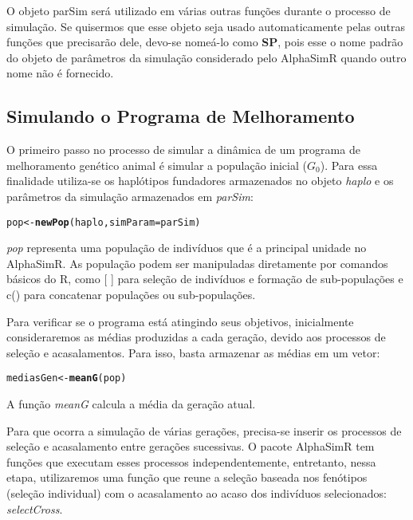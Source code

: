 \documentclass{article}\usepackage[]{graphicx}\usepackage[]{xcolor}
\makeatletter
\newcommand{\hlstd}[1]{\textcolor[rgb]{0.345,0.345,0.345}{#1}}%
\newcommand{\hlkwb}[1]{\textcolor[rgb]{0.69,0.353,0.396}{#1}}%
\newcommand{\hlkwc}[1]{\textcolor[rgb]{0.333,0.667,0.333}{#1}}%
\newcommand{\hlkwd}[1]{\textcolor[rgb]{0.737,0.353,0.396}{\textbf{#1}}}%
\newenvironment{kframe}{%
 \def\at@end@of@kframe{}%
 \ifinner\ifhmode%
  \def\at@end@of@kframe{\end{minipage}}%
  \begin{minipage}{\columnwidth}%
 \fi\fi%
 \def\FrameCommand##1{\hskip\@totalleftmargin \hskip-\fboxsep
 \colorbox{shadecolor}{##1}\hskip-\fboxsep
     \hskip-\linewidth \hskip-\@totalleftmargin \hskip\columnwidth}%
 \MakeFramed {\advance\hsize-\width
   \@totalleftmargin\z@ \linewidth\hsize
   \@setminipage}}%
 {\par\unskip\endMakeFramed%
 \at@end@of@kframe}
\newenvironment{knitrout}{}{} %
\makeatother
\begin{document}
O objeto parSim será utilizado em várias outras funções durante o processo de simulação. Se quisermos que esse objeto seja usado automaticamente pelas outras funções que precisarão dele, devo-se nomeá-lo como \textbf{SP}, pois esse o nome padrão do objeto de parâmetros da simulação considerado pelo AlphaSimR quando outro nome não é fornecido.

\subsection{Simulando o Programa de Melhoramento}

O primeiro passo no processo de simular a dinâmica de um programa de melhoramento genético animal é simular a população inicial ($G_0$). Para essa finalidade utiliza-se os haplótipos fundadores armazenados no objeto \emph{haplo} e os parâmetros da simulação armazenados em \emph{parSim}:
\begin{knitrout}
\color{fgcolor}\begin{kframe}
\begin{alltt}
\hlstd{pop}\hlkwb{<-}\hlkwd{newPop}\hlstd{(haplo,} \hlkwc{simParam} \hlstd{= parSim)}
\end{alltt}
\end{kframe}
\end{knitrout}

\emph{pop} representa uma população de indivíduos que é a principal unidade no AlphaSimR. As população podem ser manipuladas diretamente por comandos básicos do R, como [ ] para seleção de indivíduos e formação de sub-populações e c() para concatenar populações ou sub-populações.

Para verificar se o programa está atingindo seus objetivos, inicialmente consideraremos as médias produzidas a cada geração, devido aos processos de seleção e acasalamentos. Para isso, basta armazenar as médias em um vetor:
\begin{knitrout}
\color{fgcolor}\begin{kframe}
\begin{alltt}
\hlstd{mediasGen}\hlkwb{<-}\hlkwd{meanG}\hlstd{(pop)}
\end{alltt}
\end{kframe}
\end{knitrout}

A função \emph{meanG} calcula a média da geração atual.

Para que ocorra a simulação de várias gerações, precisa-se inserir os processos de seleção e acasalamento entre gerações sucessivas. O pacote AlphaSimR tem funções que executam esses processos independentemente, entretanto, nessa etapa, utilizaremos uma função que reune a seleção baseada nos fenótipos (seleção individual) com o acasalamento ao acaso dos indivíduos selecionados: \emph{selectCross}.
\end{document}
